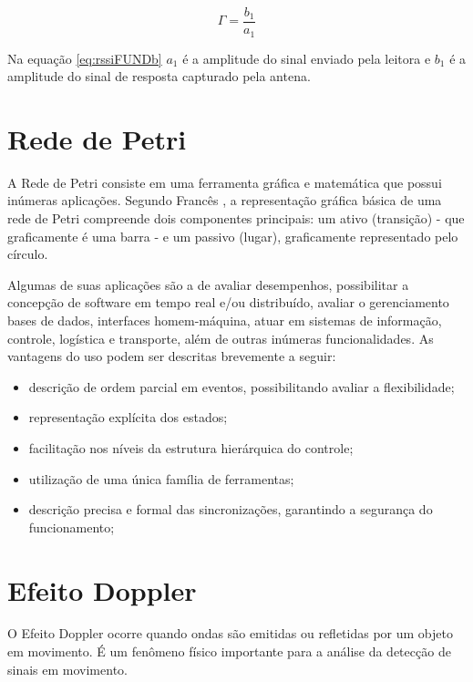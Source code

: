 \begin{equation}
    \Gamma = \frac{b_1}{a_1}
    \label{eq:rssiFUNDb}
\end{equation}

Na equação \ref{eq:rssiFUNDb} $a_1$ é a amplitude do sinal enviado pela leitora e $b_1$ é a amplitude do sinal de resposta capturado pela antena.
    
\section{Rede de Petri}
    
A Rede de Petri consiste em uma ferramenta gráfica e matemática que possui inúmeras aplicações. Segundo Francês \cite{Frances}, a representação gráfica básica de uma rede de Petri compreende dois componentes principais: um ativo (transição) - que graficamente é uma barra - e um passivo (lugar), graficamente representado pelo círculo. 

Algumas de suas aplicações são a de avaliar desempenhos, possibilitar a concepção de software em tempo real e/ou distribuído, avaliar o gerenciamento bases de dados, interfaces homem-máquina, atuar em sistemas de informação, controle, logística e transporte, além de outras inúmeras funcionalidades. As vantagens do uso podem ser descritas brevemente a seguir: \cite{Cardoso1997}

\begin{itemize}
    \item descrição de ordem parcial em eventos, possibilitando avaliar a flexibilidade;
    \item representação explícita dos estados;
    \item facilitação nos níveis da estrutura hierárquica do controle;
    \item utilização de uma única família de ferramentas; 
    \item descrição precisa e formal das sincronizações, garantindo a segurança do funcionamento;
\end{itemize}
    
\section{Efeito Doppler} \label{section:doppler_fund}

O Efeito Doppler ocorre quando ondas são emitidas ou refletidas por um objeto em movimento. É um fenômeno físico importante para a análise da detecção de sinais em movimento.

